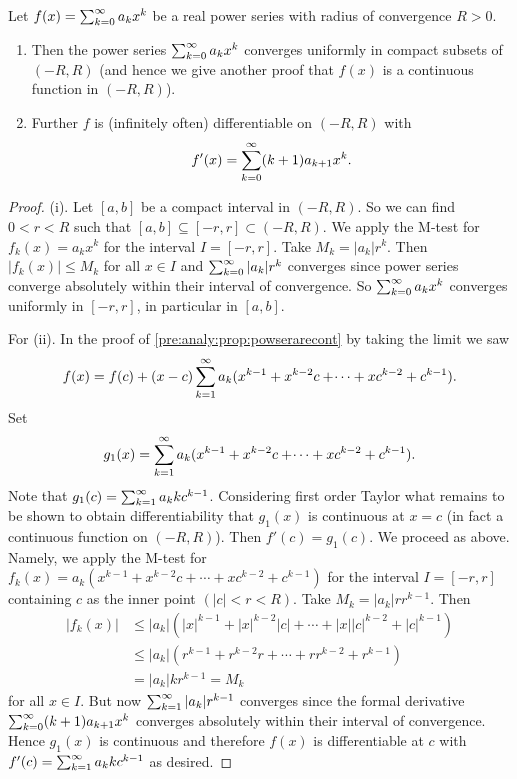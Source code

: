 \documentclass[10pt, a4paper]{article}
\newcommand{\infsumo}{\infsum[k = 0]}
\begin{document}
\begin{theorem}
    Let $f(x) = \infsumo a_kx ^ k$ be a real power series with radius of convergence $R > 0$.
    \begin{enumerate}[label = (\roman*)]
        \item Then the power series $\infsumo a_kx ^ k$ converges uniformly in compact subsets of $(-R, R)$
        (and hence we give another proof that $f(x)$ is a continuous function in $(-R, R)$).

        \item Further $f$ is
        (infinitely often)
        differentiable on $(-R, R)$ with
        \[
        f'(x) = \infsumo(k + 1)a_{k + 1}x ^ k.
        \]
    \end{enumerate}
    \begin{proof}
        (i).
        Let $[a, b]$ be a compact interval in $(-R, R)$.
        So we can find $0 < r < R$ such that $[a, b] \subseteq [-r, r] \subset (-R, R)$.
        We apply the M-test for $f_k(x) = a_kx ^ k$ for the interval $I = [-r, r]$.
        Take $M_k = |a_k|r ^ k$.
        Then $|f_k(x)| \leq M_k$ for all $x \in I$ and $\infsumo|a_k|r ^ k$ converges since power series converge absolutely within their interval of convergence.
        So $\infsumo a_kx ^ k$ converges uniformly in $[-r, r]$,
        in particular in $[a, b]$.

        For (ii).
        In the proof of \autoref{pre:analy:prop:powserarecont} by taking the limit we saw
        \[
        f(x) = f(c) + (x - c)\sum_{k = 1}^{\infty} a_k(x ^ {k - 1} + x ^ {k - 2}c + \dotsi + xc ^ {k - 2} + c ^ {k - 1}).
        \]
        Set
        \[
        g_1(x) = \sum_{k = 1}^{\infty} a_k(x ^ {k - 1} + x ^ {k - 2}c + \dotsi + xc ^ {k - 2} + c ^ {k - 1}).
        \]
        Note that $g_1(c) = \sum_{k = 1}^{\infty} a_kkc ^ {k - 1}$.
        Considering first order Taylor what remains to be shown to obtain differentiability that $g_1(x)$ is continuous at $x = c$
        (in fact a continuous function on $(-R, R)$).
        Then $f'(c) = g_1(c)$.
        We proceed as above.
        Namely,
        we apply the M-test for $f_k(x) = a_k(x ^ {k - 1} + x ^ {k - 2}c + \dotsi + xc ^ {k - 2} + c ^ {k - 1})$ for the interval $I = [-r, r]$ containing $c$ as the inner point $(|c| < r < R)$.
        Take $M_k = |a_k|rr ^ {k - 1}$.
        Then
        \begin{align*}
            |f_k(x)| &\leq |a_k|\left(|x| ^ {k - 1} + |x| ^ {k - 2}|c| + \dotsi + |x||c| ^ {k - 2} + |c| ^ {k - 1}\right) \\
            &\leq |a_k|(r ^ {k - 1} + r ^ {k - 2}r + \dotsi + rr ^ {k - 2} + r ^ {k - 1}) \\
            &= |a_k|kr ^ {k - 1} = M_k
        \end{align*}
        for all $x \in I$.
        But now $\sum_{k = 1}^{\infty}|a_k|r ^ {k - 1}$ converges since the formal derivative $\infsumo(k + 1)a_{k + 1}x ^ k$ converges absolutely within their interval of convergence.
        Hence $g_1(x)$ is continuous and therefore $f(x)$ is differentiable at $c$ with $f'(c) = \sum_{k = 1}^{\infty} a_kkc ^ {k - 1}$ as desired.
    \end{proof}
\end{theorem}
\end{document}
